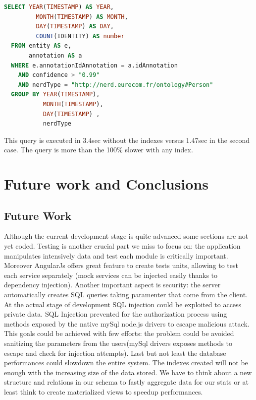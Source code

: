 \documentclass[a4paper,13pt]{report}
\begin{document}
\vspace{0.9cm}
        \begin{lstlisting}[language=SQL]
  SELECT YEAR(TIMESTAMP) AS YEAR,
         MONTH(TIMESTAMP) AS MONTH,
         DAY(TIMESTAMP) AS DAY,
         COUNT(IDENTITY) AS number
  FROM entity AS e,
       annotation AS a
  WHERE e.annotationIdAnnotation = a.idAnnotation
    AND confidence > "0.99"
    AND nerdType = "http://nerd.eurecom.fr/ontology#Person"
  GROUP BY YEAR(TIMESTAMP),
           MONTH(TIMESTAMP),
           DAY(TIMESTAMP) ,
           nerdType
        \end{lstlisting}
\vspace{0.3cm}
This query is executed in 3.4sec without the indexes versus 1.47sec in the second case. The query is more than the 100\% slower with any index.

\chapter{Future work and Conclusions} %
\label{cha:future_work_and_conclusions}
\section{Future Work}
Although the current development stage is quite advanced some sections are  not yet coded.
Testing is another crucial part we miss to focus on: the application manipulates intensively data and test each module is critically important. Moreover AngularJs offers great feature to create  tests units, allowing to test each service separately (mock services can be injected easily thanks to dependency injection).\newline
Another important aspect is security: the server automatically creates SQL queries taking paramenter that come from the client. At the actual stage of development SQL injection could be exploited to access private data. SQL Injection prevented for the authorization process using methods exposed by the native mySql node.js drivers to escape malicious attack.
This goals could be achieved with few efforts: the problem could be avoided sanitizing the parameters from the users(mySql drivers exposes methods to escape and check for injection attempts).\newline
Last but not least the database performances could slowdown the entire system. The indexes created  will not be enough with the increasing size of the data stored. We have to think about a new structure and relations in our schema to fastly aggregate data for our stats or at least think to create materialized views to speedup performances.\newline
\end{document}

